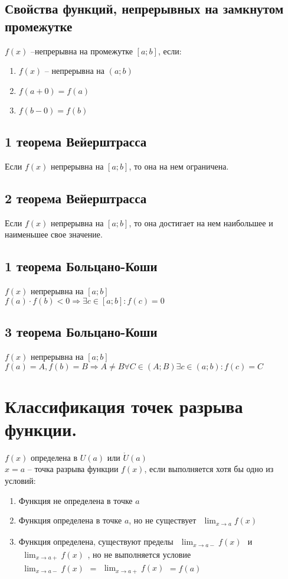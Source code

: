 \documentclass[12pt, fleqn]{article}
\begin{document}
\subsection{Свойства функций, непрерывных на замкнутом промежутке}
$f(x)$ --непрерывна на промежутке $[a;b]$, если:
\begin{enumerate}
	\item $f(x)$ -- непрерывна на $(a;b)$
	\item $f(a+0)=f(a)$
	\item $f(b-0)=f(b)$
\end{enumerate}
\subsection*{1 теорема Вейерштрасса}
Если $f(x)$ непрерывна на $[a;b]$, то она на нем ограничена.
\subsection*{2 теорема Вейерштрасса}
Если $f(x)$ непрерывна на $[a;b]$, то она достигает на нем наибольшее и наименьшее свое значение.
\subsection*{1 теорема Больцано-Коши}
$f(x)$ непрерывна на $[a;b]$\\
$f(a)\cdot f(b)<0\Rightarrow\exists c\in[a;b]\colon f(c)=0$
\subsection*{3 теорема Больцано-Коши}
$f(x)$ непрерывна на $[a;b]$\\
$f(a)=A , f(b)=B \Rightarrow A\neq B \forall C \in (A;B)\exists c \in (a;b)\colon f(c)=C$
\section{Классификация точек разрыва функции.}
$f(x)$ определена в $U(a)$ или $\mathring{U}(a)$\\
$x=a$ -- точка разрыва функции $f(x)$, если выполняется хотя бы одно из условий:
\begin{enumerate}[\space1)]
	\item Функция не определена в точке $a$
	\item Функция определена в точке $a$, но не существует $\begin{gathered}
		\lim_{x\to a}f(x)
	\end{gathered}$
	\item Функция определена, существуют пределы $\begin{gathered}
		\lim_{x\to a-}f(x)
	\end{gathered}$ и $\begin{gathered}
	\lim_{x\to a+}f(x)
	\end{gathered}$, но не выполняется условие $\begin{gathered}
	\lim_{x\to a-}f(x)
	\end{gathered} = \begin{gathered}
	\lim_{x\to a+}f(x)
	\end{gathered} = f(a)$
\end{enumerate}
\end{document}
